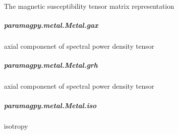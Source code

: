 \documentclass[a4paper,10pt,english,openany,oneside]{sphinxmanual}
\begin{document}
\begin{fulllineitems}
\begin{fulllineitems}
\begin{fulllineitems}
\label{\detokenize{reference/generated/paramagpy.metal.Metal.g_tensor:paramagpy.metal.Metal.g_tensor}}
The magnetic susceptibility tensor matrix representation

\end{fulllineitems}



\subparagraph{paramagpy.metal.Metal.gax}
\label{\detokenize{reference/generated/paramagpy.metal.Metal.gax:paramagpy-metal-metal-gax}}\label{\detokenize{reference/generated/paramagpy.metal.Metal.gax::doc}}

\begin{fulllineitems}
\label{\detokenize{reference/generated/paramagpy.metal.Metal.gax:paramagpy.metal.Metal.gax}}
axial componenet of spectral power density tensor

\end{fulllineitems}



\subparagraph{paramagpy.metal.Metal.grh}
\label{\detokenize{reference/generated/paramagpy.metal.Metal.grh:paramagpy-metal-metal-grh}}\label{\detokenize{reference/generated/paramagpy.metal.Metal.grh::doc}}

\begin{fulllineitems}
\label{\detokenize{reference/generated/paramagpy.metal.Metal.grh:paramagpy.metal.Metal.grh}}
axial componenet of spectral power density tensor

\end{fulllineitems}



\subparagraph{paramagpy.metal.Metal.iso}
\label{\detokenize{reference/generated/paramagpy.metal.Metal.iso:paramagpy-metal-metal-iso}}\label{\detokenize{reference/generated/paramagpy.metal.Metal.iso::doc}}

\begin{fulllineitems}
\label{\detokenize{reference/generated/paramagpy.metal.Metal.iso:paramagpy.metal.Metal.iso}}
isotropy


\end{fulllineitems}
\end{fulllineitems}
\end{fulllineitems}
\end{document}
